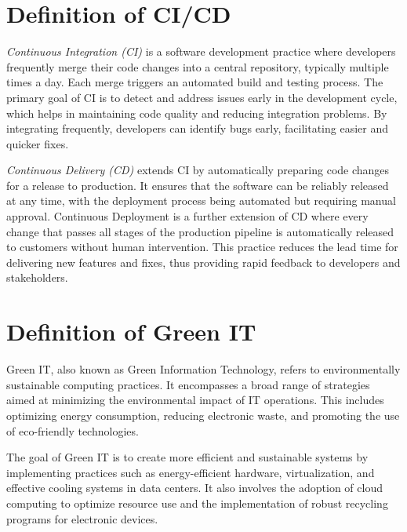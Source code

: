 \section{Definition of CI/CD}
\textit{Continuous Integration (CI)} is a software development practice where developers frequently merge their code changes into a central repository, typically multiple times a day. Each merge triggers an automated build and testing process. The primary goal of CI is to detect and address issues early in the development cycle, which helps in maintaining code quality and reducing integration problems. By integrating frequently, developers can identify bugs early, facilitating easier and quicker fixes.

\textit{Continuous Delivery (CD)} extends CI by automatically preparing code changes for a release to production. It ensures that the software can be reliably released at any time, with the deployment process being automated but requiring manual approval. Continuous Deployment is a further extension of CD where every change that passes all stages of the production pipeline is automatically released to customers without human intervention. This practice reduces the lead time for delivering new features and fixes, thus providing rapid feedback to developers and stakeholders.

\section{Definition of Green IT}

Green IT, also known as Green Information Technology, refers to environmentally sustainable computing practices. It encompasses a broad range of strategies aimed at minimizing the environmental impact of IT operations. This includes optimizing energy consumption, reducing electronic waste, and promoting the use of eco-friendly technologies. 

The goal of Green IT is to create more efficient and sustainable systems by implementing practices such as energy-efficient hardware, virtualization, and effective cooling systems in data centers. It also involves the adoption of cloud computing to optimize resource use and the implementation of robust recycling programs for electronic devices.

